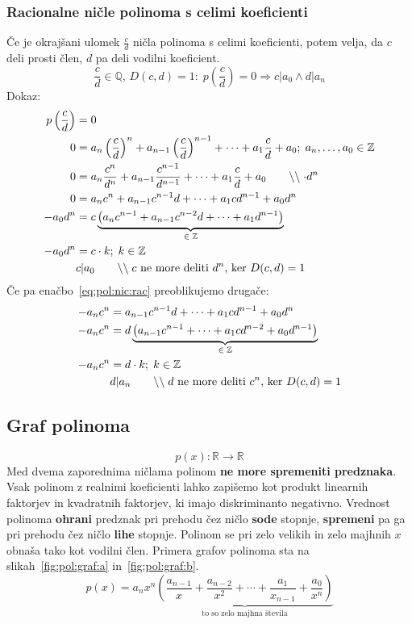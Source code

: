 \documentclass[a4paper,oneside,12pt,fleqn]{article}
\def\R{\ensuremath{\mathbb R}}
\def\Z{\ensuremath{\mathbb Z}}
\def\Q{\ensuremath{\mathbb Q}}
\newcommand\krat\cdot
\newcommand{\comment}[1]{\ensuremath{\qquad\backslash\backslash\;}\textnormal{#1}}
\renewcommand\implies\Rightarrow
\numberwithin{equation}{section}
\begin{document}
\subsubsection{Racionalne ničle polinoma s celimi koeficienti}
\label{sec:pol:nic:rac}
Če je okrajšani ulomek $\frac{c}{d}$ ničla polinoma s celimi koeficienti, potem velja, da $c$ deli
prosti člen, $d$ pa deli vodilni koeficient.
\[ \frac{c}{d} \in \Q,\,D(c,d)=1\!:\;p\left( \frac{c}{d} \right) = 0 \implies
c|a_0 \land d|a_n \]
Dokaz:
\begin{align}
  p\left(\frac{c}{d}\right) &= 0 \nonumber \\
  0 &= a_n\left(\frac{c}{d}\right)^n+a_{n-1}\left(\frac{c}{d}\right)^{n-1}+\cdots+a_1\frac{c}{d}+a_0; \; a_n,\ldots,a_0 \in \Z \nonumber \\
  0 &= a_n\frac{c^n}{d^n}+a_{n-1}\frac{c^{n-1}}{d^{n-1}}+\cdots+a_1\frac{c}{d}+a_0
  \comment{$\krat d^n$} \nonumber \\
  0 &= a_nc^n+a_{n-1}c^{n-1}d+\cdots+a_1cd^{n-1}+a_0d^n \label{eq:pol:nic:rac} \\
  -a_0d^n &= c\underbrace{\left(a_nc^{n-1}+a_{n-1}c^{n-2}d+\cdots+a_1d^{n-1}\right)}_{\in\;\Z} \nonumber \\
  -a_0d^n &= c \krat k; \; k \in \Z \nonumber \\
  & c|a_0 \comment{$c$ ne more deliti $d^n$, ker $D(c,d)=1$} \nonumber
\end{align}
Če pa enačbo~\eqref{eq:pol:nic:rac} preoblikujemo drugače:
\begin{align*}
  -a_nc^n &= a_{n-1}c^{n-1}d+\cdots+a_1cd^{n-1}+a_0d^n \\
  -a_nc^n &= d\underbrace{\left(a_{n-1}c^{n-1}+\cdots+a_1cd^{n-2}+a_0d^{n-1}\right)}_{\in\;\Z} \\
  -a_nc^n &= d \krat k; \; k \in \Z \\
  & d|a_n \comment{$d$ ne more deliti $c^n$, ker $D(c,d)=1$}
\end{align*}

\subsection{Graf polinoma}
\label{sec:pol:graf}
\[ p(x)\!: \R \rightarrow \R \]
Med dvema zaporednima ničlama polinom \textbf{ne more spremeniti predznaka}. Vsak polinom z
realnimi koeficienti lahko zapišemo kot produkt linearnih faktorjev in kvadratnih
faktorjev, ki imajo diskriminanto negativno.
Vrednost polinoma \textbf{ohrani} predznak pri prehodu čez ničlo \textbf{sode} stopnje,
\textbf{spremeni} pa ga pri prehodu čez ničlo \textbf{lihe} stopnje.
Polinom se pri zelo velikih in zelo majhnih $x$ obnaša tako kot vodilni člen. Primera
grafov polinoma sta na slikah~\ref{fig:pol:graf:a} in~\ref{fig:pol:graf:b}.
\[ p(x) = a_nx^n\underbrace{\left(\frac{a_{n-1}}{x}+\frac{a_{n-2}}{x^2}+\cdots+\frac{a_1}{x_{n-1}}+\frac{a_0}{x^n}\right)}_{\text{to
so zelo majhna števila}} \]
\end{document}
